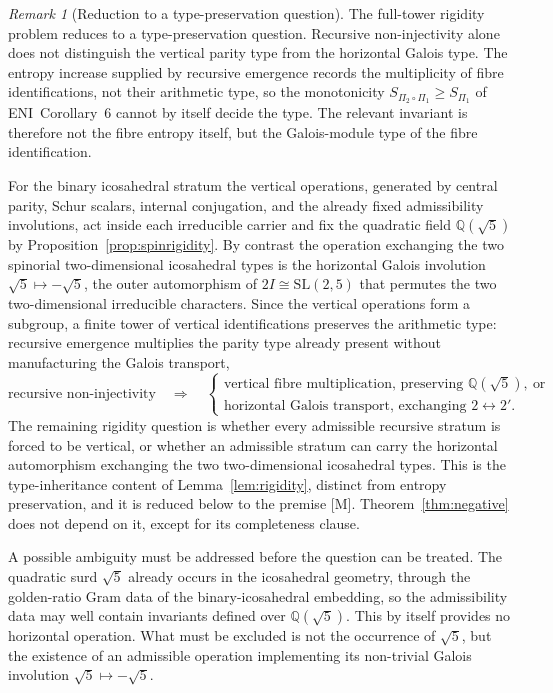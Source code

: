 \documentclass[11pt]{article}
\theoremstyle{definition}
\theoremstyle{remark}
\newtheorem{remark}{Remark}
\begin{document}
    \begin{remark}[Reduction to a type-preservation question]
      \label{rem:type-preservation}
The full-tower rigidity problem reduces to a type-preservation question.
Recursive non-injectivity alone does not distinguish the vertical parity type from the horizontal Galois type.
The entropy increase supplied by recursive emergence records the multiplicity of fibre identifications, not their
arithmetic type, so the monotonicity $S_{\Pi_2\circ\Pi_1}\geq S_{\Pi_1}$ of ENI~Corollary~6 cannot by itself decide
the type.
The relevant invariant is therefore not the fibre entropy itself, but the Galois-module type of the fibre
identification.

For the binary icosahedral stratum the vertical operations, generated by central parity, Schur scalars, internal
conjugation, and the already fixed admissibility involutions, act inside each irreducible carrier and fix the
quadratic field $\mathbb{Q}(\sqrt{5})$ by Proposition~\ref{prop:spinrigidity}.
By contrast the operation exchanging the two spinorial two-dimensional icosahedral types is the horizontal
Galois involution $\sqrt{5}\mapsto-\sqrt{5}$, the outer automorphism of $2I\cong\mathrm{SL}(2,5)$ that permutes the
two two-dimensional irreducible characters.
Since the vertical operations form a subgroup, a finite tower of vertical identifications preserves the arithmetic
type: recursive emergence multiplies the parity type already present without manufacturing the Galois transport,
\[
  \text{recursive non-injectivity}\quad\Longrightarrow\quad
  \begin{cases}
    \text{vertical fibre multiplication, preserving }\mathbb{Q}(\sqrt{5}),\ \text{or}\\
    \text{horizontal Galois transport, exchanging }2\leftrightarrow 2'.
  \end{cases}
\]
The remaining rigidity question is whether every admissible recursive stratum is forced to be vertical, or whether
an admissible stratum can carry the horizontal automorphism exchanging the two two-dimensional icosahedral types.
This is the type-inheritance content of Lemma~\ref{lem:rigidity}, distinct from entropy preservation, and it is
reduced below to the premise [M].
Theorem~\ref{thm:negative} does not depend on it, except for its completeness clause.
    \end{remark}

    A possible ambiguity must be addressed before the question can be treated.
    The quadratic surd $\sqrt{5}$ already occurs in the icosahedral geometry, through the golden-ratio Gram data of the
    binary-icosahedral embedding, so the admissibility data may well contain invariants defined over
    $\mathbb{Q}(\sqrt{5})$.
    This by itself provides no horizontal operation.
    What must be excluded is not the occurrence of $\sqrt{5}$, but the existence of an admissible operation
    implementing its non-trivial Galois involution $\sqrt{5}\mapsto-\sqrt{5}$.
\end{document}
